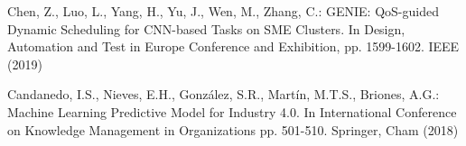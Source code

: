 \documentclass[runningheads]{llncs}
\begin{document}
\begin{thebibliography}{8}
 Chen, Z., Luo, L., Yang, H., Yu, J., Wen, M., Zhang, C.:  GENIE: QoS-guided Dynamic Scheduling for CNN-based Tasks on SME Clusters. In Design, Automation and Test in Europe Conference and Exhibition, pp. 1599-1602. IEEE (2019)

 Candanedo, I.S., Nieves, E.H., González, S.R., Martín, M.T.S., Briones, A.G.: Machine Learning Predictive Model for Industry 4.0. In International Conference on Knowledge Management in Organizations pp. 501-510. Springer, Cham (2018)





\end{thebibliography}
\end{document}
